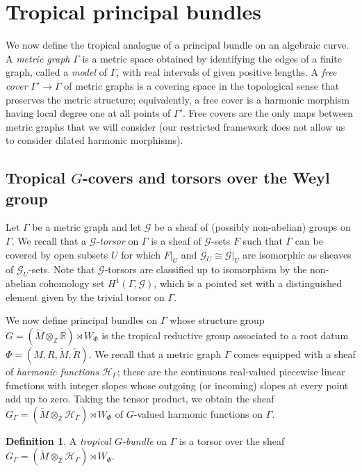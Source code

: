 \documentclass[10pt, a4paper]{amsart}
\theoremstyle{definition}
\newtheorem{definition}[theorem]{Definition}
\theoremstyle{myitemstyle}
\newcommand{\ZZ}{\mathbb{Z}}
\newcommand{\RR}{\mathbb{R}}
\newcommand{\Mcheck}{{\check{M}}}
\newcommand{\Rcheck}{\check{R}}
\newcommand{\calG}{\mathcal{G}}
\newcommand{\calH}{\mathcal{H}}
\newcommand{\Ga}{\Gamma}
\begin{document}
\section{Tropical principal bundles}

We now define the tropical analogue of a principal bundle on an algebraic curve. A \emph{metric graph} $\Ga$ is a metric space obtained by identifying the edges of a finite graph, called a \emph{model} of $\Ga$, with real intervals of given positive lengths. A \emph{free cover} $\Ga'\to \Ga$ of metric graphs is a covering space in the topological sense that preserves the metric structure; equivalently, a free cover is a harmonic morphism having local degree one at all points of $\Ga'$. Free covers are the only maps between metric graphs that we will consider (our restricted framework does not allow us to consider dilated harmonic morphisms). 




\subsection{Tropical $G$-covers and torsors over the Weyl group}\label{subsect:principalbundles} Let $\Ga$ be a metric graph and let \( \mathcal{G} \) be a sheaf of (possibly non-abelian) groups on \( \Gamma \). We recall that a \textit{\( \mathcal{G} \)-torsor} on \( \Gamma \) is a sheaf of \( \mathcal{G} \)-sets $F$ such that \( \Gamma \) can be covered by open subsets \( U \) for which \( F|_U \) and \( \calG_U \cong \mathcal{G}|_U \) are isomorphic as sheaves of \( \calG_U \)-sets. Note that $\mathcal{G}$-torsors are classified up to isomorphism by the non-abelian cohomology set $H^1(\Ga,\mathcal{G})$, which is a pointed set with a distinguished element given by the trivial torsor on $\Gamma$.

We now define principal bundles on $\Gamma$ whose structure group $G=(\Mcheck \otimes_{\ZZ} \RR)\rtimes W_{\Phi}$ is the tropical reductive group associated to a root datum $\Phi=(M, R,\Mcheck,\Rcheck)$. We recall that a metric graph $\Ga$ comes equipped with a sheaf of \emph{harmonic functions} $\calH_{\Ga}$; these are the continuous real-valued piecewise linear functions with integer slopes whose outgoing (or incoming) slopes at every point add up to zero. Taking the tensor product, we obtain the sheaf $G_{\Gamma}=(\Mcheck \otimes_{\ZZ}\calH_{\Gamma})\rtimes W_{\Phi}$ of $G$-valued harmonic functions on $\Ga$. 


\begin{definition} A \textit{tropical $G$-bundle} on $\Gamma$ is a torsor over the sheaf $G_{\Gamma}=(\Mcheck \otimes_{\ZZ}\calH_{\Gamma})\rtimes W_{\Phi}$.

\end{definition}
\end{document}
